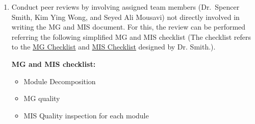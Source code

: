 \documentclass[12pt, titlepage]{article}
\begin{document}
\begin{enumerate}

\item  Conduct peer reviews by involving assigned team members (Dr.\ Spencer Smith, Kim Ying Wong, and Seyed Ali Mousavi) not directly involved in writing the MG and MIS document. For this, the review can be performed referring the following simplified MG and MIS checklist (The checklist refers to the \href{https://github.com/smiths/capTemplate/blob/9251702fdcb9800c59f6ed3d11d91e2bd62fca6d/docs/Checklists/MG-Checklist.pdf}{MG Checklist} and \href{https://github.com/smiths/capTemplate/blob/9251702fdcb9800c59f6ed3d11d91e2bd62fca6d/docs/Checklists/MIS-Checklist.pdf}{MIS Checklist} designed by Dr. Smith.). 

\textbf{MG and MIS checklist:}
\begin{itemize}
    \item Module Decomposition
    \item MG quality
    \item MIS Quality inspection for each module


\end{itemize}
\end{enumerate}
\end{document}
